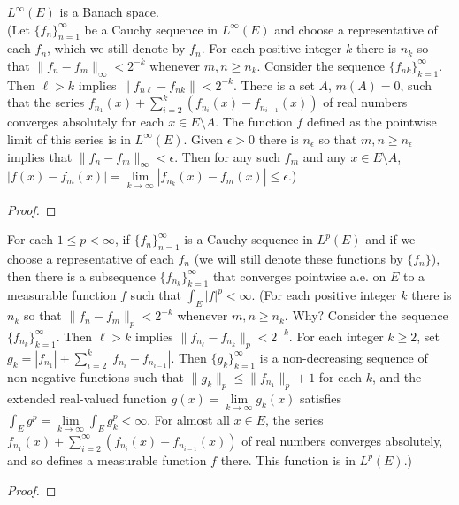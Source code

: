 \begin{pblm} %
	$L^\infty(E)$ is a Banach space. \\
	(Let $\{f_n\}_{n=1}^\infty$ be a Cauchy sequence in $L^\infty(E)$ and choose a representative 
	of each $f_n$, which we still denote by $f_n$. For each positive integer $k$ there is $n_k$ 
	so that $\|f_n - f_m\|_\infty < 2^{-k}$ whenever $m, n \ge n_k$. Consider the sequence 
	$\{f_{nk}\}_{k=1}^\infty$. Then $\ell > k$ implies $\|f_{n\ell} - f_{nk}\| < 2^{-k}$. There is 
	a set $A$, $m(A) = 0$, such that the series $f_{n_1}(x) + \sum\limits_{i=2}^k (f_{n_i}(x) - f_{n_{i-1}}(x))$ 
	of real numbers converges absolutely for each $x \in E\setminus A$. The function $f$ defined as 
	the pointwise limit of this series is in $L^\infty(E)$. Given $\epsilon > 0$ there is 
	$n_\epsilon$ so that $m, n \ge n_\epsilon$ implies that $\|f_n - f_m\|_\infty < \epsilon$. Then 
	for any such $f_m$ and any $x \in E\setminus A$, $|f(x) - f_m(x)| = 
	\lim\limits_{k\to\infty}|f_{n_k}(x) - f_m(x)|\le\epsilon$.)
\begin{proof}
\end{proof}
\end{pblm}

\begin{pblm}%
	For each $1\le p < \infty$, if $\{f_n\}_{n=1}^\infty$ is a Cauchy sequence in $L^p(E)$ and 
	if we choose a representative of each $f_n$ (we will still denote these functions by $\{f_n\}$), 
	then there is a subsequence $\{f_{n_k}\}_{k=1}^\infty$ that converges pointwise a.e. on $E$ to 
	a measurable function $f$ such that $\int_E|f|^p < \infty$. (For each positive integer $k$ there 
	is $n_k$ so that $\|f_n - f_m\|_p < 2^{-k}$ whenever $m,n \ge n_k$. Why? Consider the sequence 
	$\{f_{n_k}\}_{k=1}^\infty$. Then $\ell > k$ implies $\|f_{n_\ell} - f_{n_k}\|_p < 2^{-k}$. 
	For each integer $k \ge 2$, set $g_k = |f_{n_1}| + \sum\limits_{i=2}^k|f_{n_i} - f_{n_{i-1}}|$. 
	Then $\{g_k\}_{k=1}^\infty$ is a non-decreasing sequence of non-negative functions such that 
	$\|g_k\|_p \le \|f_{n_1}\|_p + 1$ for each $k$, and the extended real-valued function 
	$g(x) = \lim\limits_{k\to\infty}g_k(x)$ satisfies $\int_Eg^p = \lim\limits_{k\to\infty}\int_Eg^p_k < \infty$. 
	For almost all $x \in E$, the series $f_{n_1}(x) + \sum\limits_{i=2}^\infty (f_{n_i}(x) - f_{n_{i-1}}(x))$ 
	of real numbers converges absolutely, and so defines a measurable  function $f$ there. This 
	function is in $L^p(E)$.)
\begin{proof}
\end{proof}
\end{pblm}


